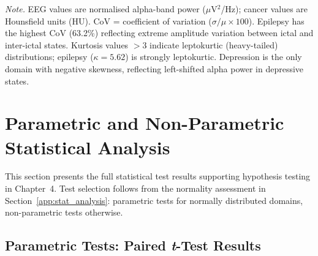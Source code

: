 \vspace{0.5em}\noindent\textit{Note.} EEG values are normalised alpha-band power ($\mu$V$^2$/Hz); cancer values are Hounsfield units (HU). CoV = coefficient of variation ($\sigma/\mu \times 100$). Epilepsy has the highest CoV (63.2\%) reflecting extreme amplitude variation between ictal and inter-ictal states. Kurtosis values $> 3$ indicate leptokurtic (heavy-tailed) distributions; epilepsy ($\kappa = 5.62$) is strongly leptokurtic. Depression is the only domain with negative skewness, reflecting left-shifted alpha power in depressive states.

\section{Parametric and Non-Parametric Statistical Analysis}
\label{app:parametric_analysis}

This section presents the full statistical test results supporting hypothesis testing in Chapter~4. Test selection follows from the normality assessment in Section~\ref{app:stat_analysis}: parametric tests for normally distributed domains, non-parametric tests otherwise.

\subsection{Parametric Tests: Paired \textit{t}-Test Results}

